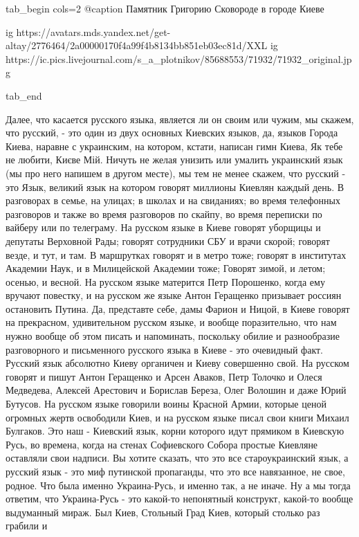 \ifcmt
tab_begin cols=2
  @caption Памятник Григорию Сковороде в городе Киеве

  ig https://avatars.mds.yandex.net/get-altay/2776464/2a00000170f4a99f4b8134bb851eb03ec81d/XXL
	ig https://ic.pics.livejournal.com/s_a_plotnikov/85688553/71932/71932_original.jpg

tab_end
\fi

Далее, что касается русского языка, является ли он своим или чужим, мы скажем,
что русский, - это один из двух основных Киевских языков, да, языков Города
Киева, наравне с украинским, на котором, кстати, написан гимн Киева, Як тебе не
любити, Києве Мій. Ничуть не желая унизить или умалить украинский язык (мы про
него напишем в другом месте), мы тем не менее скажем, что русский - это Язык,
великий язык на котором говорят миллионы Киевлян каждый день. В разговорах в
семье, на улицах; в школах и на свиданиях; во время телефонных разговоров и
также во время разговоров по скайпу, во время переписки по вайберу или по
телеграму. На русском языке в Киеве говорят уборщицы и депутаты Верховной Рады;
говорят сотрудники СБУ и врачи скорой; говорят везде, и тут, и там. В
маршрутках говорят и в метро тоже; говорят в институтах Академии Наук, и в
Милицейской Академии тоже; Говорят зимой, и летом; осенью, и весной. На русском
языке матерится Петр Порошенко, когда ему вручают повестку, и на русском же
языке Антон Геращенко призывает россиян остановить Путина. Да, представте себе,
дамы Фарион и Ницой, в Киеве говорят на прекрасном, удивительном русском языке,
и вообще поразительно, что нам нужно вообще об этом писать и напоминать,
поскольку обилие и разнообразие разговорного и письменного русского языка в
Киеве - это очевидный факт.  Русский язык абсолютно Киеву органичен и Киеву
совершенно свой. На русском говорят и пишут Антон Геращенко и Арсен Аваков,
Петр Толочко и Олеся Медведева, Алексей Арестович и Борислав Береза, Олег
Волошин и даже Юрий Бутусов. На русском языке говорили воины Красной Армии,
которые ценой огромных жертв освободили Киев, и на русском языке писал свои
книги Михаил Булгаков. Это наш - Киевский язык, корни которого идут прямиком в
Киевскую Русь, во времена, когда на стенах Софиевского Собора простые Киевляне
оставляли свои надписи. Вы хотите сказать, что это все староукраинский язык, а
русский язык - это миф путинской пропаганды, что это все навязанное, не свое,
родное. Что была именно Украина-Русь, и именно так, а не иначе.  Ну а мы тогда
ответим, что Украина-Русь - это какой-то непонятный конструкт, какой-то вообще
выдуманный мираж. Был Киев, Стольный Град Киев, который столько раз грабили и
